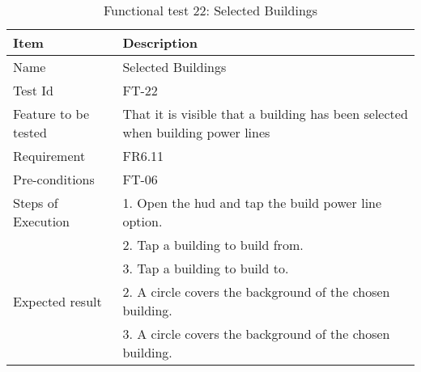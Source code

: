 \begin{table}[H]
\centering
	\begin{tabular}{ l | p{8cm} }
		\hline
		\rowcolor{lightgray}
		{\bf Item} & {\bf Description} \\ \hline
		Name & Selected Buildings \\ 
		Test Id & FT-22 \\ 
		Feature to be tested & That it is visible that a building has been selected when building power lines \\ 
		Requirement & FR6.11 \\ 
		Pre-conditions & FT-06 \\ 
		Steps of Execution & 1. Open the hud and tap the build power line option. \\
		& 2. Tap a building to build from. \\
		& 3. Tap a building to build to. \\
		Expected result & 2. A circle covers the background of the chosen building. \\
		& 3. A circle covers the background of the chosen building. \\
		\hline
	\end{tabular}
	\caption{Functional test 22: Selected Buildings}
\end{table}

